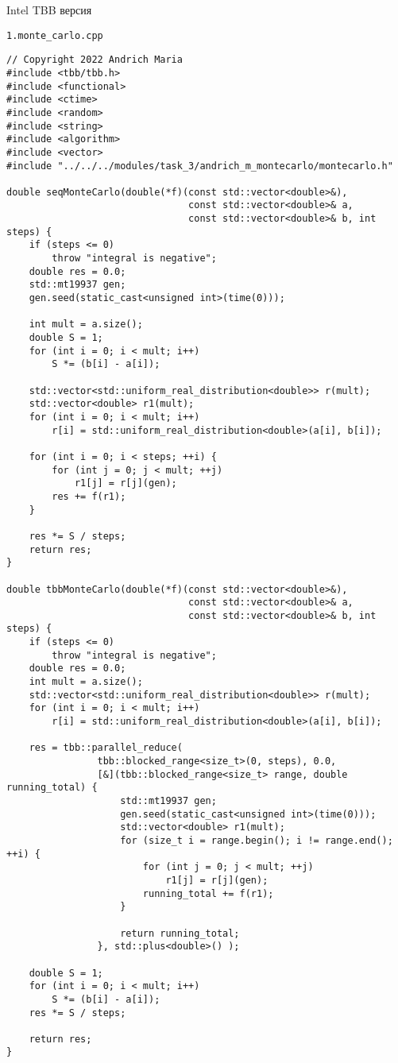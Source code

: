 \documentclass{report}
\begin{document}
\par Intel TBB версия
\par \verb|1.monte_carlo.cpp|
\begin{lstlisting}
// Copyright 2022 Andrich Maria
#include <tbb/tbb.h>
#include <functional>
#include <ctime>
#include <random>
#include <string>
#include <algorithm>
#include <vector>
#include "../../../modules/task_3/andrich_m_montecarlo/montecarlo.h"

double seqMonteCarlo(double(*f)(const std::vector<double>&),
                                const std::vector<double>& a,
                                const std::vector<double>& b, int steps) {
    if (steps <= 0)
        throw "integral is negative";
    double res = 0.0;
    std::mt19937 gen;
    gen.seed(static_cast<unsigned int>(time(0)));

    int mult = a.size();
    double S = 1;
    for (int i = 0; i < mult; i++)
        S *= (b[i] - a[i]);

    std::vector<std::uniform_real_distribution<double>> r(mult);
    std::vector<double> r1(mult);
    for (int i = 0; i < mult; i++)
        r[i] = std::uniform_real_distribution<double>(a[i], b[i]);

    for (int i = 0; i < steps; ++i) {
        for (int j = 0; j < mult; ++j)
            r1[j] = r[j](gen);
        res += f(r1);
    }

    res *= S / steps;
    return res;
}

double tbbMonteCarlo(double(*f)(const std::vector<double>&),
                                const std::vector<double>& a,
                                const std::vector<double>& b, int steps) {
    if (steps <= 0)
        throw "integral is negative";
    double res = 0.0;
    int mult = a.size();
    std::vector<std::uniform_real_distribution<double>> r(mult);
    for (int i = 0; i < mult; i++)
        r[i] = std::uniform_real_distribution<double>(a[i], b[i]);

    res = tbb::parallel_reduce(
                tbb::blocked_range<size_t>(0, steps), 0.0,
                [&](tbb::blocked_range<size_t> range, double running_total) {
                    std::mt19937 gen;
                    gen.seed(static_cast<unsigned int>(time(0)));
                    std::vector<double> r1(mult);
                    for (size_t i = range.begin(); i != range.end(); ++i) {
                        for (int j = 0; j < mult; ++j)
                            r1[j] = r[j](gen);
                        running_total += f(r1);
                    }

                    return running_total;
                }, std::plus<double>() );

    double S = 1;
    for (int i = 0; i < mult; i++)
        S *= (b[i] - a[i]);
    res *= S / steps;

    return res;
}
\end{lstlisting}
\end{document}
